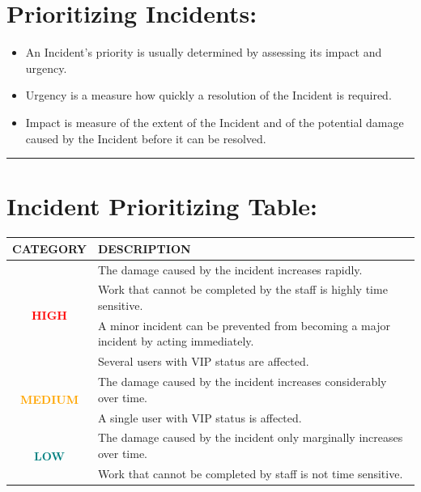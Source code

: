 \documentclass[british]{article}
\providecommand{\tabularnewline}{\\}
\providecommand{\tabularnewline}{\\}
\begin{document}
\section{Prioritizing Incidents:}
\begin{itemize}
	\item An Incident's priority is usually determined by assessing its impact
	      and urgency.
	\item Urgency is a measure how quickly a resolution of the Incident is required.
	\item Impact is measure of the extent of the Incident and of the potential
	      damage caused by the Incident before it can be resolved.
\end{itemize}
\rule[0.5ex]{0.75\columnwidth}{1pt}

\pagebreak{}

\section{Incident Prioritizing Table:}
\begin{center}
	\begin{tabular}{|c||l|}
		\hline
		\textbf{CATEGORY}                                            & \textbf{DESCRIPTION}\tabularnewline
		\hline
		\hline
		\multirow{4}{*}{\textbf{\textcolor{red}{\Large{}HIGH}}}      & The damage caused by the incident increases rapidly. \tabularnewline
		\cline{2-2}
		                                                             & Work that cannot be completed by the staff is highly time sensitive.\tabularnewline
		\cline{2-2}
		                                                             & A minor incident can be prevented from becoming a major incident by
		acting immediately.\tabularnewline
		\cline{2-2}
		                                                             & Several users with VIP status are affected.\tabularnewline
		\hline
		\multirow{2}{*}{\textbf{\textcolor{orange}{\Large{}MEDIUM}}} & The damage caused by the incident increases considerably over time. \tabularnewline
		\cline{2-2}
		                                                             & A single user with VIP status is affected. \tabularnewline
		\hline
		\multirow{2}{*}{\textbf{\textcolor{teal}{\Large{}LOW}}}      & The damage caused by the incident only marginally increases over time. \tabularnewline
		\cline{2-2}
		                                                             & Work that cannot be completed by staff is not time sensitive.\tabularnewline
		\hline
	\end{tabular}
	\par\end{center}
\end{document}
